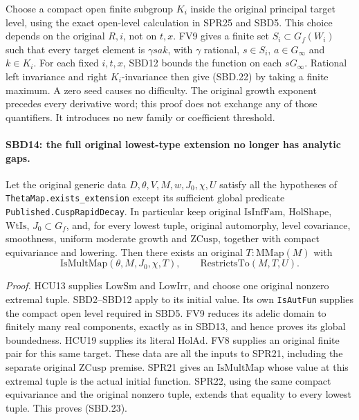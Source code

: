 \documentclass[11pt,a4paper]{article}
\numberwithin{equation}{section}
\theoremstyle{remark}\newtheorem{remark}[theorem]{Remark}
\begin{document}
Choose a compact open finite subgroup \(K_i\) inside the
original principal target level, using the exact open-level
calculation in SPR25 and SBD5.  This choice depends on the
original \(R,i\), not on \(t,x\).  FV9 gives a finite set
\(S_i\subset G_f(W_i)\) such that every target element is
\(\gamma s a k\), with \(\gamma\) rational,
\(s\in S_i\), \(a\in G_\infty\) and \(k\in K_i\).
For each fixed \(i,t,x\), SBD12 bounds the function on each
\(sG_\infty\).  Rational left invariance and right
\(K_i\)-invariance then give (SBD.22) by taking a finite
maximum.  A zero seed causes no difficulty.  The original
growth exponent precedes every derivative word; this proof
does not exchange any of those quantifiers.  It introduces
no new family or coefficient threshold.

\paragraph{SBD14: the full original lowest-type extension no longer has analytic gaps.}
\label{claim:SBD14}
Let the original generic data \(D,\theta,V,M,w,J_0,\chi,U\)
satisfy all the hypotheses of
\texttt{Theta\allowbreak Map.\allowbreak exists\_\allowbreak extension} except its sufficient
global predicate \texttt{Published.\allowbreak Cusp\allowbreak Rapid\allowbreak Decay}.
In particular keep original \(\mathrm{IsInfFam}\),
\(\mathrm{HolShape}\), \(\mathrm{WtIs}\),
\(J_0\subset G_f\), and, for every lowest tuple, original
automorphy, level covariance, smoothness, uniform moderate
growth and \(\mathrm{ZCusp}\), together with compact
equivariance and lowering.  Then there exists an original
\(T:\mathrm{MMap}(M)\) with
\[
       \mathrm{IsMultMap}(\theta,M,J_0,\chi,T),\qquad
       \mathrm{RestrictsTo}(M,T,U).
 \tag{SBD.23}
\]

\emph{Proof.}
HCU13 supplies \(\mathrm{LowSm}\) and \(\mathrm{LowIrr}\),
and choose one original nonzero extremal tuple.  SBD2--SBD12
apply to its initial value.  Its own \texttt{Is\allowbreak Aut\allowbreak Fun} supplies
the compact open level required in SBD5.  FV9 reduces its
adelic domain to finitely many real components, exactly as
in SBD13, and hence proves its global boundedness.
HCU19 supplies its literal \(\mathrm{HolAd}\).  FV8 supplies
an original finite pair for this same target.  These data are
all the inputs to SPR21, including the separate original
\(\mathrm{ZCusp}\) premise.  SPR21 gives an \(\mathrm{IsMultMap}\)
whose value at this extremal tuple is the actual initial
function.  SPR22, using the same compact equivariance and
the original nonzero tuple, extends that equality to every
lowest tuple.  This proves (SBD.23).
\end{document}
